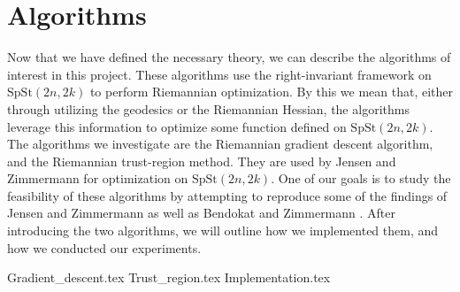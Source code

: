 \section{Algorithms}\label{sec:Algorithms}
Now that we have defined the necessary theory, we can describe the algorithms of interest in this project. These algorithms use the right-invariant framework on $\mathrm{SpSt}(2n, 2k)$ to perform Riemannian optimization. By this we mean that, either through utilizing the geodesics or the Riemannian Hessian, the algorithms leverage this information to optimize some function defined on $\mathrm{SpSt}(2n, 2k)$. The algorithms we investigate are the Riemannian gradient descent algorithm, and the Riemannian trust-region method. They are used by Jensen and Zimmermann for optimization on $\mathrm{SpSt}(2n, 2k)$. One of our goals is to study the feasibility of these algorithms by attempting to reproduce some of the findings of Jensen and Zimmermann \cite{JensenZimmermann2024} as well as Bendokat and Zimmermann \cite{BendokatZimmermann2021}. After introducing the two algorithms, we will outline how we implemented them, and how we conducted our experiments. 

{Gradient_descent.tex}
{Trust_region.tex}
{Implementation.tex}